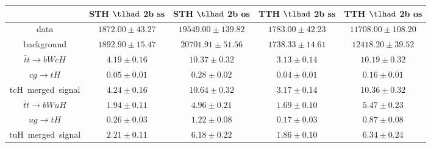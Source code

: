 \begin{table}
\begin{tabular}{|c|c|c|c|c|}
\end{tabular}
\begin{tabular}{|c|c|c|c|c|} \hline
 & STH $\tlhad$ 2b ss & STH $\tlhad$ 2b os & TTH $\tlhad$ 2b ss & TTH $\tlhad$ 2b os\\\hline
data & $1872.00\pm43.27$ & $19549.00\pm139.82$ & $1783.00\pm42.23$ & $11708.00\pm108.20$\\\hline
background & $1892.90\pm15.47$ & $20701.91\pm51.56$ & $1738.33\pm14.61$ & $12418.20\pm39.52$\\\hline
$\bar{t}t\to bWcH$ & $4.19\pm0.16$ & $10.37\pm0.32$ & $3.13\pm0.14$ & $10.19\pm0.32$\\\hline
$cg\to tH$ & $0.05\pm0.01$ & $0.28\pm0.02$ & $0.04\pm0.01$ & $0.16\pm0.01$\\\hline
tcH~merged~signal & $4.24\pm0.16$ & $10.64\pm0.32$ & $3.17\pm0.14$ & $10.36\pm0.32$\\\hline
$\bar{t}t\to bWuH$ & $1.94\pm0.11$ & $4.96\pm0.21$ & $1.69\pm0.10$ & $5.47\pm0.23$\\\hline
$ug\to tH$ & $0.26\pm0.03$ & $1.22\pm0.08$ & $0.17\pm0.03$ & $0.87\pm0.08$\\\hline
tuH~merged~signal & $2.21\pm0.11$ & $6.18\pm0.22$ & $1.86\pm0.10$ & $6.34\pm0.24$\\\hline
\end{tabular}
\label{tab:yield}
\end{table}
